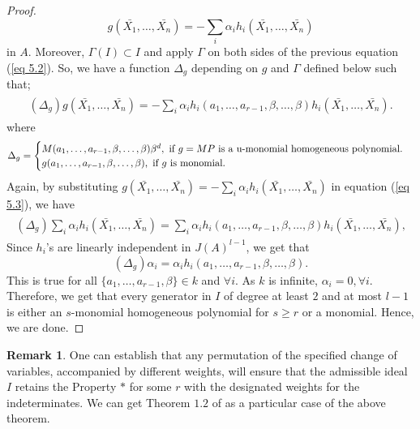 \documentclass[12pt]{amsart}
\theoremstyle{definition}
\newtheorem{remark}[theorem]{Remark}
\numberwithin{equation}{section}
\begin{document}
\begin{proof}
\begin{equation}\label{eq 5.2}
g(\bar{X_1},\dots,\bar{X_n})=-\sum_i\alpha_{i}h_{i}(\bar{X_1},\dots,\bar{X_n})
\end{equation}
in $A$. Moreover, $\Gamma(I)\subset I$ and apply $\Gamma$ on both sides of the previous equation (\ref{eq 5.2}). So, we have a function $\Delta_g$ depending on $g$ and $\Gamma$ defined below such that;
\begin{align}\label{eq 5.3}
\begin{split}
(\Delta_{g})g(\bar {X_1},\dots,\bar{X_n})=-\sum_i\alpha_ih_i(a_1,\dots,a_{r-1},\beta,\dots,\beta)h_i(\bar{X_1},\dots,\bar{X_n}).
\end{split}
\end{align}
where \begin{equation*}
    \Delta_{g}=
   \begin{cases}
        M(a_1,\dots,a_{r-1},\beta,\dots,\beta)\beta^d ,\text{ if } g=MP \text{ is a }$u-$\text{monomial homogeneous polynomial.}\\
        g(a_1,\dots,a_{r-1},\beta,\dots,\beta), \text{ if } g \text{ is monomial. }
    \end{cases}
\end{equation*}
\vskip2mm
\noindent
Again, by substituting $g(\bar{X_1},\dots,\bar{X_n})=-\sum_i\alpha_{i}h_i(\bar{X_1},\dots,\bar{X_n})$ in equation (\ref{eq 5.3}), we have 
\begin{align*}
\begin{split}
(\Delta_{g})\sum_i\alpha_ih_i(\bar{X_1},\dots,\bar{X_n})=\sum_i\alpha_ih_i(a_1,\dots,a_{r-1},\beta,\dots,\beta)h_i(\bar{X_1},\dots,\bar{X_n}),
\end{split}
\end{align*}
\noindent
Since ${h_i}$'s are linearly independent in $J(A)^{l-1}$, we get that
\begin{equation*}
(\Delta_g)\alpha_i=\alpha_ih_i(a_1,\dots,a_{r-1},\beta,\dots,\beta).
\end{equation*}
This is true for all $\{a_1,\dots,a_{r-1},\beta\}\in k$ and $\forall i$. As $k$ is infinite, $\alpha_{i}=0, \forall i$. Therefore, we get that every generator in $I$ of degree at least $2$ and at most $l-1$ is either an $s$-monomial homogeneous polynomial for $s\geq r$ or a monomial. Hence, we are done.
\end{proof}

\vskip1mm

\begin{remark}\label{Remark 5.26}
One can establish that any permutation of the specified change of variables, accompanied by different weights, will ensure that the admissible ideal $I$ retains the Property $*$ for some $r$ with the designated weights for the indeterminates. We can get Theorem $1.2$ of \cite{AS1} as a particular case of the above theorem.
\end{remark}
\vskip1mm
\end{document}

